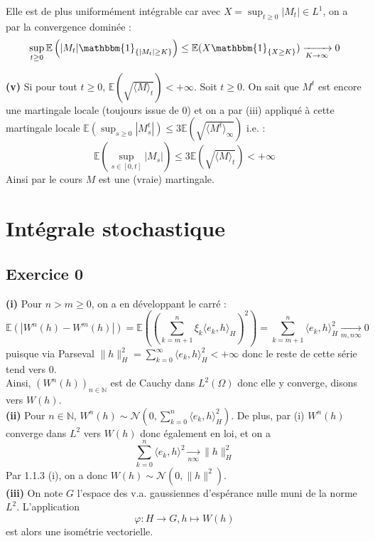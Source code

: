 \documentclass[a4paper,12pt]{article}
\newcommand{\E}{\mathbb{E}}
\newcommand{\ind}{\mathbbm{1}}
\newcommand{\n}{\mathbb{N}}
\newcommand{\norm}{\mathcal{N}}
\begin{document}
Elle est de plus uniformément intégrable car avec $X = \sup_{t \geq 0} |M_t| \in L^1$, on a par la convergence dominée :
$$\sup_{t \geq 0} \E \left( |M_t| \ind_{\{ |M_t| \geq K \}} \right) \leq \E (X \ind_{\{ X \geq K \}}) \xrightarrow[K \to \infty]{} 0 $$

\textbf{(v)} Si pour tout $t \geq 0$, $\E (\sqrt{\langle M \rangle_t}) < + \infty$. Soit $t \geq 0$. On sait que $M^t$ est encore une martingale locale (toujours issue de $0$) et on a par (iii) appliqué à cette martingale locale $\E \left( \sup_{s \geq 0} |M_s^t| \right) \leq 3 \E (\sqrt{\langle M^t \rangle_{\infty}})$ i.e. : 
$$\E \left( \sup_{s \in [0,t]} |M_s| \right) \leq 3 \E \left( \sqrt{\langle M \rangle_t } \right) < + \infty$$ 
Ainsi par le cours $M$ est une (vraie) martingale.

\newpage

\section{Intégrale stochastique}

\subsection{Exercice 0}
\textbf{(i)} Pour $n>m \geq 0$, on a en développant le carré :
$$\E (|W^n (h) - W^m(h)|) = \E \left( \left( \sum_{k=m+1}^n \xi_k \langle e_k, h \rangle_H \right)^2 \right) = \sum_{k=m+1}^n \langle e_k, h \rangle_H^2 \xrightarrow[m,n \infty]{} 0$$
puisque via Parseval $\|h\|_H^2 = \sum_{k=0}^{\infty} \langle e_k, h \rangle_H^2 < + \infty$ donc le reste de cette série tend vers $0$. \\

Ainsi, $(W^n(h))_{n \in \n}$ est de Cauchy dans $L^2 (\Omega)$ donc elle y converge, disons vers $W(h)$. \\

\textbf{(ii)} Pour $n \in \n$, $W^n (h) \sim \norm (0, \sum_{k=0}^n \langle e_k, h \rangle_H^2)$. De plus, par (i) $W^n(h)$ converge dans $L^2$ vers $W(h)$ donc également en loi, et on a 
$$\sum_{k=0}^n \langle e_k, h \rangle^2 \xrightarrow[n \infty]{} \|h\|^2_H$$
Par 1.1.3 (i), on a donc $W(h) \sim \norm (0, \|h\|^2 )$. \\

\textbf{(iii)} On note $G$ l'espace des v.a. gaussiennes d'espérance nulle muni de la norme $L^2$. L'application 
$$\varphi : H \rightarrow G, h \mapsto W(h)$$
est alors une isométrie vectorielle. \\
\end{document}

